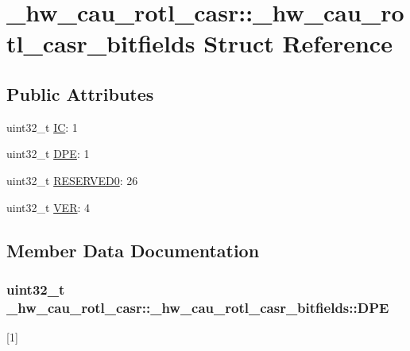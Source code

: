 \hypertarget{struct__hw__cau__rotl__casr_1_1__hw__cau__rotl__casr__bitfields}{}\section{\+\_\+hw\+\_\+cau\+\_\+rotl\+\_\+casr\+:\+:\+\_\+hw\+\_\+cau\+\_\+rotl\+\_\+casr\+\_\+bitfields Struct Reference}
\label{struct__hw__cau__rotl__casr_1_1__hw__cau__rotl__casr__bitfields}
\subsection*{Public Attributes}
\begin{DoxyCompactItemize}
\item 
uint32\+\_\+t \hyperlink{struct__hw__cau__rotl__casr_1_1__hw__cau__rotl__casr__bitfields_a523638e2ee735472333d5a7e7af53cd8}{IC}\+: 1
\item 
uint32\+\_\+t \hyperlink{struct__hw__cau__rotl__casr_1_1__hw__cau__rotl__casr__bitfields_a12ad77766ab7b610344ba6d9fb6c3155}{D\+PE}\+: 1
\item 
uint32\+\_\+t \hyperlink{struct__hw__cau__rotl__casr_1_1__hw__cau__rotl__casr__bitfields_a36a0959e80923573e1e948787c3a0cd9}{R\+E\+S\+E\+R\+V\+E\+D0}\+: 26
\item 
uint32\+\_\+t \hyperlink{struct__hw__cau__rotl__casr_1_1__hw__cau__rotl__casr__bitfields_af0571a83ee156a6917b8d84ba4718944}{V\+ER}\+: 4
\end{DoxyCompactItemize}


\subsection{Member Data Documentation}
\subsubsection[{\texorpdfstring{D\+PE}{DPE}}]{\setlength{\rightskip}{0pt plus 5cm}uint32\+\_\+t \+\_\+hw\+\_\+cau\+\_\+rotl\+\_\+casr\+::\+\_\+hw\+\_\+cau\+\_\+rotl\+\_\+casr\+\_\+bitfields\+::\+D\+PE}\hypertarget{struct__hw__cau__rotl__casr_1_1__hw__cau__rotl__casr__bitfields_a12ad77766ab7b610344ba6d9fb6c3155}{}\label{struct__hw__cau__rotl__casr_1_1__hw__cau__rotl__casr__bitfields_a12ad77766ab7b610344ba6d9fb6c3155}
\mbox{[}1\mbox{]} 
